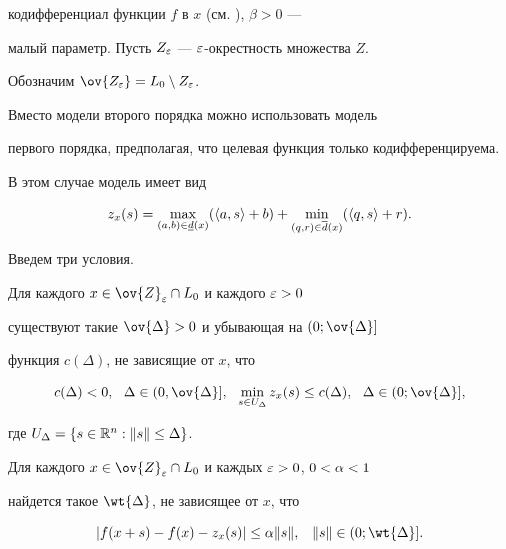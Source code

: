 кодифференциал функции $f$ в $x$ (см. \cite{demrub}), $\beta>0$ --- 


малый параметр.  Пусть $Z_{\varepsilon}$ --- $\varepsilon$-окрестность множества $Z$.


Обозначим $\ov{Z_{\e}}= L_0 \setminus Z_{\e}$.





Вместо модели второго порядка можно использовать модель


первого порядка, предполагая, что целевая функция только кодифференцируема.


В этом случае модель имеет вид


$$


z_x (s) = \max_{(a,b) \in \underline{d}


(x)} ( \la a,s\ra + b) + \min_{(q,r) \in \overline{d} (x)} (\la q,s\ra+r).


$$





Введем три условия.





\begin{cond}


Для каждого $x \in \ov{Z}_\e \cap L_0$ и каждого $\varepsilon>0$


существуют такие $\ov{\Delta}>0$ и убывающая на $(0; \ov{\Delta}]$


функция $c(\Delta)$, не зависящие от $x$, что


$$


c(\Delta) <0, \ \ \Delta \in (0,\ov{\Delta}],


\ \ \min_{s \in U_{\Delta}}


z_x (s) \leq c(\Delta), \ \ \Delta \in (0;\ov{\Delta}],


$$


где $U_{\Delta} = \{ s \in \Bbb R^n: \|s\| \leq \Delta \}$.


\end{cond}





\begin{cond}


Для каждого $x \in \ov{Z}_\e \cap L_0$ и каждых $\varepsilon>0$, $0<\alpha<1$


найдется такое $\wt{\Delta}$, не зависящее от $x$, что


$$


|f(x+s) - f(x) - z_x (s)| \leq \ga \|s\|, \;\;\; \|s\| \in


(0;\wt{\Delta}].


$$


\end{cond}





